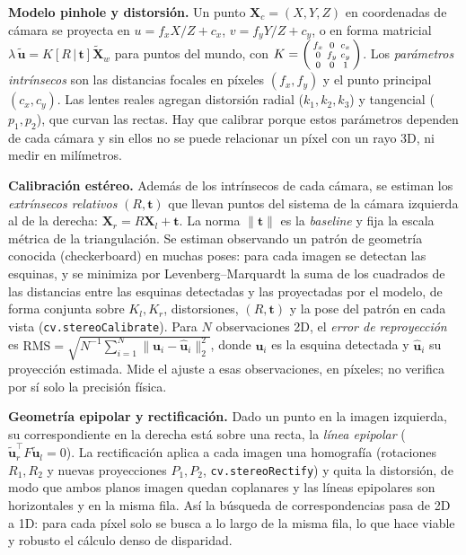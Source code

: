 \documentclass[10pt,a4paper]{article}
\begin{document}
\textbf{Modelo pinhole y distorsión.} Un punto $\mathbf{X}_c=(X,Y,Z)$ en coordenadas de cámara
se proyecta en $u = f_x X/Z + c_x$, $v = f_y Y/Z + c_y$, o en forma matricial
$\lambda\,\tilde{\mathbf{u}} = K[R\,|\,\mathbf{t}]\tilde{\mathbf{X}}_w$ para puntos del mundo, con
$K=\begin{psmallmatrix} f_x & 0 & c_x\\ 0 & f_y & c_y \\ 0&0&1\end{psmallmatrix}$.
Los \emph{parámetros intrínsecos} son las distancias focales en píxeles $(f_x,f_y)$ y el punto
principal $(c_x,c_y)$. Las lentes reales agregan distorsión radial ($k_1,k_2,k_3$) y tangencial
($p_1,p_2$), que curvan las rectas. Hay que calibrar porque estos parámetros dependen de cada
cámara y sin ellos no se puede relacionar un píxel con un rayo 3D, ni medir en milímetros.

\textbf{Calibración estéreo.} Además de los intrínsecos de cada cámara, se estiman los
\emph{extrínsecos relativos} $(R,\mathbf{t})$ que llevan puntos del sistema de la cámara izquierda
al de la derecha: $\mathbf{X}_r = R\mathbf{X}_l+\mathbf{t}$. La norma $\|\mathbf{t}\|$ es la
\emph{baseline} y fija la escala métrica de la triangulación. Se estiman observando un patrón
de geometría conocida (checkerboard) en muchas poses: para cada imagen se detectan las esquinas,
y se minimiza por Levenberg--Marquardt la suma de los cuadrados de las distancias entre las
esquinas detectadas y las proyectadas por el modelo, de forma conjunta sobre $K_l, K_r$,
distorsiones, $(R,\mathbf{t})$ y la pose del patrón en cada vista (\texttt{cv.stereoCalibrate}).
Para $N$ observaciones 2D, el \emph{error de reproyección} es
$\mathrm{RMS}=\sqrt{N^{-1}\sum_{i=1}^{N}\|\mathbf{u}_i-\hat{\mathbf{u}}_i\|_2^2}$,
donde $\mathbf{u}_i$ es la esquina detectada y $\hat{\mathbf{u}}_i$ su proyección estimada.
Mide el ajuste a esas observaciones, en píxeles; no verifica por sí solo la precisión física.

\textbf{Geometría epipolar y rectificación.} Dado un punto en la imagen izquierda, su
correspondiente en la derecha está sobre una recta, la \emph{línea epipolar}
($\tilde{\mathbf{u}}_r^\top F\tilde{\mathbf{u}}_l=0$). La rectificación aplica a cada imagen una
homografía (rotaciones $R_1, R_2$ y nuevas proyecciones $P_1,P_2$, \texttt{cv.stereoRectify}) y
quita la distorsión, de modo que ambos planos imagen quedan coplanares y las líneas epipolares
son horizontales y en la misma fila. Así la búsqueda de correspondencias pasa de 2D a 1D:
para cada píxel solo se busca a lo largo de la misma fila, lo que hace viable y robusto el
cálculo denso de disparidad.
\end{document}

